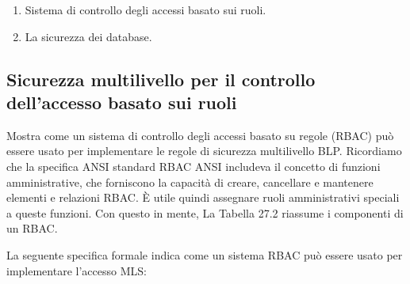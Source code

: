 \begin{enumerate}
    \item Sistema di controllo degli accessi basato sui ruoli.
    
    \item La sicurezza dei database.
\end{enumerate}
\newpage
\subsection{Sicurezza multilivello per il controllo dell'accesso basato sui ruoli}

Mostra come un sistema di controllo degli accessi basato su regole (RBAC) può essere usato per implementare le regole di sicurezza multilivello BLP. Ricordiamo che la specifica ANSI standard RBAC ANSI includeva il concetto di funzioni amministrative, che forniscono la capacità di creare, cancellare e mantenere elementi e relazioni RBAC. È utile quindi assegnare ruoli amministrativi speciali a queste funzioni. Con questo in mente, La Tabella 27.2 riassume i componenti di un RBAC.

\singlespacing

La seguente specifica formale indica come un sistema RBAC può essere usato per implementare l'accesso MLS:

